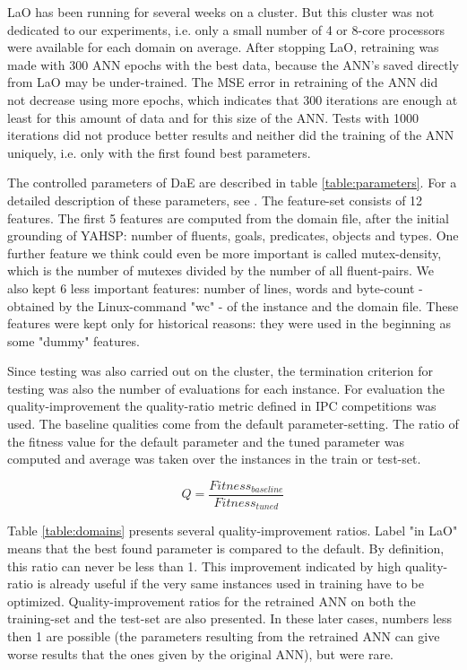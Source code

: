 \documentclass[runningheads,a4paper]{llncs}
\begin{document}
LaO has been running for several weeks on a cluster. But this cluster was not dedicated to our experiments, i.e. only a small number of 4 or 8-core processors were available for each domain on average. After stopping LaO, retraining was made with 300 ANN epochs with the best data, because the ANN's saved directly from LaO may be under-trained. The MSE error in retraining of the ANN did not decrease using more epochs, which indicates that 300 iterations are enough at least for this amount of data and for this size of the ANN. Tests with 1000 iterations did not produce better results and neither did the training of the ANN uniquely, i.e. only with the first found best parameters.

The controlled parameters of DaE are described in table \ref{table:parameters}. For a detailed description of these parameters, see \cite{BibGECCO:2010}. The feature-set consists of 12 features. The first 5 features are computed from the domain file, after the initial grounding of YAHSP: number of fluents, goals, predicates, objects and types. One further feature we think could even be more important is called mutex-density, which is the number of mutexes divided by the number of all fluent-pairs. We also kept 6 less important features: number of lines, words and byte-count - obtained by the Linux-command "wc" - of the instance and the domain file. These features were kept only for historical reasons: they were used in the beginning as some "dummy" features.

Since testing was also carried out on the cluster, the termination criterion for testing was also the number of evaluations for each instance. For evaluation the quality-improvement the quality-ratio metric defined in IPC competitions was used. The baseline qualities come from the default parameter-setting. The ratio of the fitness value for the default parameter and the tuned parameter was computed and average was taken over the instances in the train or test-set. 

\begin{equation}Q=\frac{Fitness_{baseline}}{Fitness_{tuned}}\end{equation}

Table \ref{table:domains} presents several quality-improvement ratios. Label "in LaO" means that the best found parameter is compared to the default. By definition, this ratio can never be less than 1. This improvement indicated by high quality-ratio is already useful if the very same instances used in training have to be optimized. Quality-improvement ratios for the retrained ANN on both the training-set and the test-set are also presented. In these later cases, numbers less then 1 are possible (the parameters resulting from the retrained ANN can give worse results that the ones given by the original ANN), but were rare. 
\end{document}
